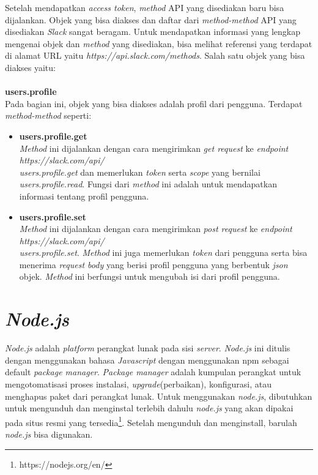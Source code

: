 Setelah mendapatkan \textit{access token}, \textit{method} API yang disediakan baru bisa dijalankan.
Objek yang bisa diakses dan daftar dari \textit{method-method} API yang disediakan \textit{Slack} sangat beragam. Untuk mendapatkan informasi yang lengkap mengenai objek dan \textit{method} yang disediakan, bisa melihat referensi yang terdapat di alamat URL yaitu \textit{https://api.slack.com/methods}. Salah satu objek yang bisa diakses yaitu:\\
\\
\textbf{users.profile}\\
Pada bagian ini, objek yang bisa diakses adalah profil dari pengguna. Terdapat \textit{method-method} seperti:
\begin{itemize}
	\item \textbf{users.profile.get}\\
	\textit{Method} ini dijalankan dengan cara mengirimkan \textit{get request} ke \textit{endpoint} \textit{https://slack.com/api/\\users.profile.get} dan memerlukan \textit{token} serta \textit{scope} yang bernilai \textit{users.profile.read}. Fungsi dari \textit{method} ini adalah untuk mendapatkan informasi tentang profil pengguna. 
	\item \textbf{users.profile.set}\\
	\textit{Method} ini dijalankan dengan cara mengirimkan \textit{post request} ke \textit{endpoint} \textit{https://slack.com/api/\\users.profile.set}. \textit{Method} ini juga memerlukan \textit{token} dari pengguna serta bisa menerima \textit{request body} yang berisi profil pengguna yang berbentuk \textit{json} objek. \textit{Method} ini berfungsi untuk mengubah isi dari profil pengguna. 
\end{itemize}

\section{\textit{Node.js}}
\label{sec:nodejs}
\textit{Node.js} adalah \textit{platform} perangkat lunak pada sisi \textit{server}.\cite{nodejs} \textit{Node.js} ini ditulis dengan menggunakan bahasa \textit{Javascript} dengan menggunakan npm sebagai default \textit{package manager}. \textit{Package manager} adalah kumpulan perangkat untuk mengotomatisasi proses instalasi, \textit{upgrade}(perbaikan), konfigurasi, atau menghapus paket dari perangkat lunak. Untuk menggunakan \textit{node.js}, dibutuhkan untuk mengunduh dan menginstal terlebih dahulu \textit{node.js} yang akan dipakai pada situs resmi yang tersedia\footnote{https://nodejs.org/en/}. Setelah mengunduh dan menginstall, barulah \textit{node.js} bisa digunakan. 


